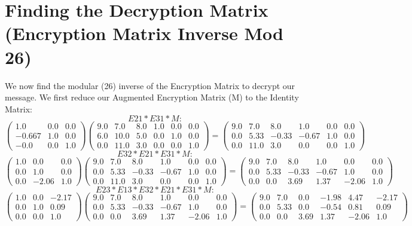 \documentclass{article}%
\begin{document}
\section{Finding the Decryption Matrix (Encryption Matrix Inverse Mod 26)}%
\label{sec:FindingtheDecryptionMatrix(EncryptionMatrixInverseMod26)}%
We now find the modular (26) inverse of the Encryption Matrix to decrypt our message. \newline%
 \newline%
%
We first reduce our Augmented Encryption Matrix (M) to the Identity Matrix: \newline%
 \newline%
%
\[%
E21 * E31 * M:%
\]%
\[%
\begin{pmatrix}%
1.0&0.0&0.0\\%
-0.667&1.0&0.0\\%
-0.0&0.0&1.0%
\end{pmatrix} \begin{pmatrix}%
9.0&7.0&8.0&1.0&0.0&0.0\\%
6.0&10.0&5.0&0.0&1.0&0.0\\%
0.0&11.0&3.0&0.0&0.0&1.0%
\end{pmatrix} = \begin{pmatrix}%
9.0&7.0&8.0&1.0&0.0&0.0\\%
0.0&5.33&-0.33&-0.67&1.0&0.0\\%
0.0&11.0&3.0&0.0&0.0&1.0%
\end{pmatrix}%
\]%
\newline%
%
\[%
E32 * E21 * E31 * M:%
\]%
\[%
\begin{pmatrix}%
1.0&0.0&0.0\\%
0.0&1.0&0.0\\%
0.0&-2.06&1.0%
\end{pmatrix} \begin{pmatrix}%
9.0&7.0&8.0&1.0&0.0&0.0\\%
0.0&5.33&-0.33&-0.67&1.0&0.0\\%
0.0&11.0&3.0&0.0&0.0&1.0%
\end{pmatrix} = \begin{pmatrix}%
9.0&7.0&8.0&1.0&0.0&0.0\\%
0.0&5.33&-0.33&-0.67&1.0&0.0\\%
0.0&0.0&3.69&1.37&-2.06&1.0%
\end{pmatrix}%
\]%
\newline%
%
\[%
E23 * E13 * E32 * E21 * E31 * M:%
\]%
\[%
\begin{pmatrix}%
1.0&0.0&-2.17\\%
0.0&1.0&0.09\\%
0.0&0.0&1.0%
\end{pmatrix} \begin{pmatrix}%
9.0&7.0&8.0&1.0&0.0&0.0\\%
0.0&5.33&-0.33&-0.67&1.0&0.0\\%
0.0&0.0&3.69&1.37&-2.06&1.0%
\end{pmatrix} = \begin{pmatrix}%
9.0&7.0&0.0&-1.98&4.47&-2.17\\%
0.0&5.33&0.0&-0.54&0.81&0.09\\%
0.0&0.0&3.69&1.37&-2.06&1.0%
\end{pmatrix}%
\]%
\end{document}
